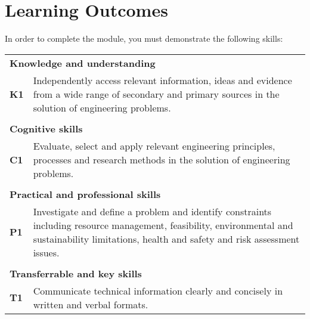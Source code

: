\chapter{Learning Outcomes}

In order to complete the module, you must demonstrate the following skills:
\vspace{3mm} 

\begin{table}[h]
    \centering
    \begin{tabularx}{350pt}{lllll}
    \multicolumn{5}{X}{\textbf{Knowledge and understanding}}       \\
    \textbf{K1}          & \multicolumn{4}{X}{Independently access relevant information, ideas and evidence from a wide range of secondary and primary sources in the solution of engineering problems.}                \\
    \vspace{3mm} \\
    \multicolumn{5}{X}{\textbf{Cognitive skills}}                  \\
    \textbf{C1}          & \multicolumn{4}{X}{Evaluate, select and apply relevant engineering principles, processes and research methods in the solution of engineering problems.}            \\
    \vspace{3mm} \\
    \multicolumn{5}{X}{\textbf{Practical and professional skills}} \\
    \textbf{P1}          & \multicolumn{4}{X}{Investigate and define a problem and identify constraints including resource management, feasibility, environmental and sustainability limitations, health and safety and risk assessment issues.}         \\
    \vspace{3mm} \\
    \multicolumn{5}{X}{\textbf{Transferrable and key skills}}      \\
    \textbf{T1}          & \multicolumn{4}{X}{Communicate technical information clearly and concisely in written and verbal formats.}        
    \end{tabularx}
\end{table}
